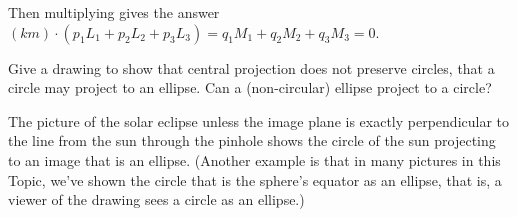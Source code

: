 \begin{exercises}
\begin{answer}
\begin{equation*}
      \end{equation*}
      Then multiplying gives the answer
      $(km)\cdot (p_1L_1+p_2L_2+p_3L_3)=q_1M_1+q_2M_2+q_3M_3=0$.
    \end{answer}
  \item 
    Give a drawing to show that central projection does not preserve 
    circles, that a circle may project to an ellipse.
    Can a (non-circular) ellipse project to a circle?
    \begin{answer}
      The picture of the solar eclipse \Dash  unless 
      the image plane is exactly perpendicular
      to the line from the sun through the pinhole \Dash  shows the circle
      of the sun projecting to an image that is an  ellipse.
      (Another example is that in many pictures in this 
      Topic, we've shown the circle that is the sphere's equator as an ellipse,
      that is, a viewer of the drawing sees a circle as an ellipse.)
      

\end{answer}
\end{exercises}
